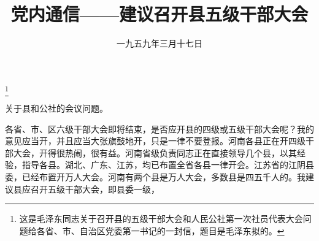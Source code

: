
\title{党内通信——建议召开县五级干部大会}
\date{一九五九年三月十七日}
\thanks{这是毛泽东同志关于召开县的五级干部大会和人民公社第一次社员代表大会问题给各省、市、自治区党委第一书记的一封信，题目是毛泽东拟的。}
\maketitle



关于县和公社的会议问题。

各省、市、区六级干部大会即将结束，是否应开县的四级或五级干部大会呢？我的意见应当开，并且应当大张旗鼓地开，只是一律不要登报。河南各县正在开四级干部大会，开得很热闹，很有益。河南省级负责同志正在直接领导几个县，以其经验，指导各县。湖北、广东、江苏，均已布置全省各县一律开会。江苏省的江阴县委，已经布置开万人大会。河南有两个县是万人大会，多数县是四五千人的。我建议县应召开五级干部大会，即县委一级，

